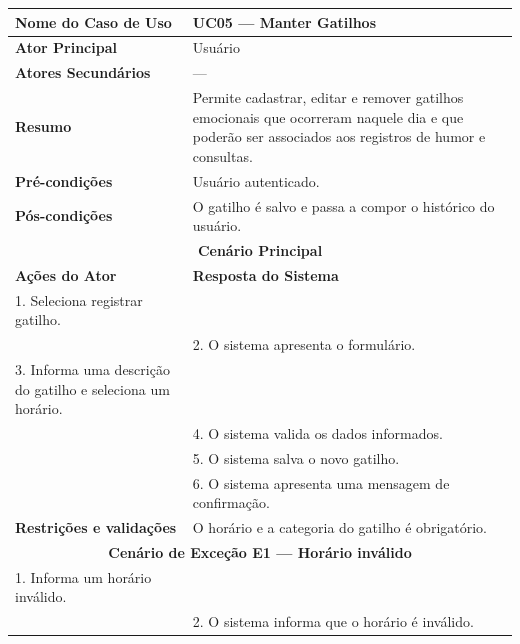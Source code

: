 
\begin{longtable}{| p{} | p{} |}
\hline

\textbf{Nome do Caso de Uso} &
UC05 --- Manter Gatilhos \\
\hline

\textbf{Ator Principal} &
Usuário \\
\hline

\textbf{Atores Secundários} &
--- \\
\hline

\textbf{Resumo} &
Permite cadastrar, editar e remover gatilhos emocionais que
ocorreram naquele dia e que poderão ser associados aos registros
de humor e consultas. \\

\hline

\textbf{Pré-condições} &
Usuário autenticado. \\
\hline

\textbf{Pós-condições} &
O gatilho é salvo e passa a compor o histórico do usuário. \\
\hline

\multicolumn{2}{|c|}{\textbf{Cenário Principal}}\\
\hline

\textbf{Ações do Ator} &
\textbf{Resposta do Sistema} \\
\hline

1. Seleciona registrar gatilho. & \\
\cline{1-2}

&
2. O sistema apresenta o formulário. \\
\cline{1-2}

3. Informa uma descrição do gatilho e seleciona um horário. & \\
\cline{1-2}

&
4. O sistema valida os dados informados. \\
\cline{1-2}

&
5. O sistema salva o novo gatilho. \\
\cline{1-2}

&
6. O sistema apresenta uma mensagem de confirmação. \\
\hline

\multirow{1}{.40\textwidth}{\textbf{Restrições e validações}}
&
O horário e a categoria do gatilho é obrigatório. \\
\cline{1-2}

\multicolumn{2}{|c|}{\textbf{Cenário de Exceção E1 --- Horário inválido}}\\
\hline

1. Informa um horário inválido. & \\
\cline{1-2}

&
2. O sistema informa que o horário é inválido. \\
\hline

\end{longtable}
